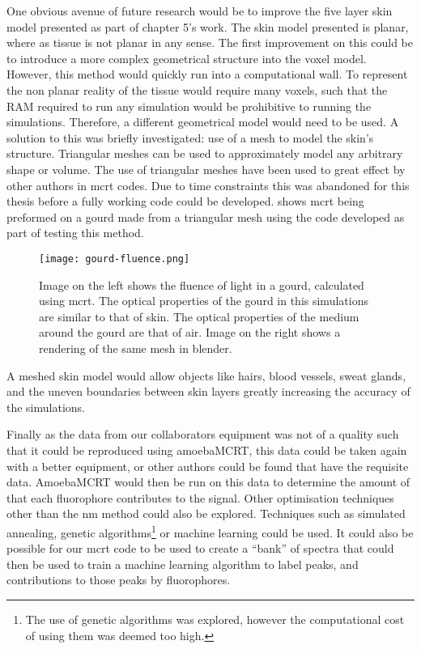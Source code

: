 One obvious avenue of future research would be to improve the five layer skin model presented as part of chapter 5's work.
The skin model presented is planar, where as tissue is not planar in any sense.
The first improvement on this could be to introduce a more complex geometrical structure into the voxel model.
However, this method would quickly run into a computational wall.
To represent the non planar reality of the tissue would require many voxels, such that the RAM required to run any simulation would be prohibitive to running the simulations.
Therefore, a different geometrical model would need to be used.
A solution to this was briefly investigated: use of a mesh to model the skin's structure.
Triangular meshes can be used to approximately model any arbitrary shape or volume.
The use of triangular meshes have been used to great effect by other authors in \gls*{mcrt} codes.
Due to time constraints this was abandoned for this thesis before a fully working code could be developed.
 shows \gls*{mcrt} being preformed on a gourd made from a triangular mesh using the code developed as part of testing this method.

\begin{figure}[!htpb]
    \centering
    \texttt{[image: gourd-fluence.png]}
    \caption{Image on the left shows the fluence of light in a gourd, calculated using \gls*{mcrt}. The optical properties of the gourd in this simulations are similar to that of skin. The optical properties of the medium around the gourd are that of air. Image on the right shows a rendering of the same mesh in blender.}
    \label{fig:mesh}
\end{figure}

A meshed skin model would allow objects like hairs, blood vessels, sweat glands, and the uneven boundaries between skin layers greatly increasing the accuracy of the simulations.

Finally as the data from our collaborators equipment was not of a quality such that it could be reproduced using amoebaMCRT, this data could be taken again with a better equipment, or other authors could be found that have the requisite data. 
AmoebaMCRT would then be run on this data to determine the amount of that each fluorophore contributes to the signal.
Other optimisation techniques other than the \gls*{nm} method could also be explored.
Techniques such as simulated annealing, genetic algorithms\footnote{The use of genetic algorithms was explored, however the computational cost of using them was deemed too high.} or machine learning could be used.
It could also be possible for our \gls*{mcrt} code to be used to create a ``bank'' of spectra that could then be used to train a machine learning algorithm to label peaks, and contributions to those peaks by fluorophores.
